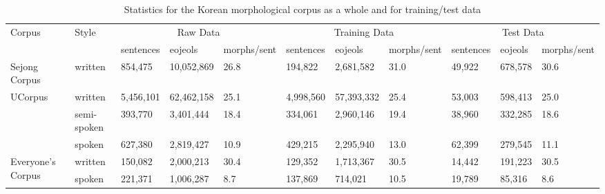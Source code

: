 \documentclass[AMS,STIX2COL]{WileyNJD-v2}
\begin{document}
    \begin{table}[h]
        \centering
        \footnotesize
        \caption{Statistics for the Korean morphological corpus as a whole and for training/test data}
        \label{tab:data-statistics}
        \begin{tabular}{m{20mm}m{14mm}m{10mm}m{12mm}m{10mm}m{10mm}m{12mm}m{10mm}m{10mm}m{12mm}m{10mm}}
            \toprule
            \multirow{2}{*}{Corpus}            & \multirow{2}{*}{Style} & \multicolumn{3}{c}{Raw Data}                 & \multicolumn{3}{c}{Training Data}            & \multicolumn{3}{c}{Test Data}             \\
            \cmidrule(lr){3-5} \cmidrule(lr){6-8} \cmidrule(lr){9-11}
            ~                                  & ~                      & sentences & eojeols    & morphs\newline/sent & sentences & eojeols    & morphs\newline/sent & sentences & eojeols & morphs\newline/sent \\
            \midrule
            Sejong Corpus                      & written                & 854,475   & 10,052,869 & 26.8                & 194,822   & 2,681,582  & 31.0                & 49,922    & 678,578 & 30.6                \\
            \midrule
            \multirow{3}{*}{UCorpus}           & written                & 5,456,101 & 62,462,158 & 25.1                & 4,998,560 & 57,393,332 & 25.4                & 53,003    & 598,413 & 25.0                \\
            ~                                  & semi-spoken            & 393,770   & 3,401,444  & 18.4                & 334,061   & 2,960,146  & 19.4                & 38,960    & 332,285 & 18.6                \\
            ~                                  & spoken                 & 627,380   & 2,819,427  & 10.9                & 429,215   & 2,295,940  & 13.0                & 62,399    & 279,545 & 11.1                \\
            \midrule
            \multirow{2}{*}{Everyone's Corpus} & written                & 150,082   & 2,000,213  & 30.4                & 129,352   & 1,713,367  & 30.5                & 14,442    & 191,223 & 30.5                \\
            ~                                  & spoken                 & 221,371   & 1,006,287  & 8.7                 & 137,869   & 714,021    & 10.5                & 19,789    & 85,316  & 8.6                 \\
            \bottomrule
        \end{tabular}
    \end{table}
\end{document}
